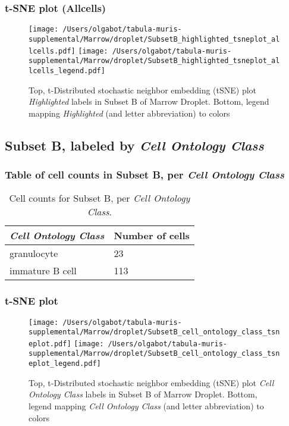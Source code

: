 \subsubsection{t-SNE plot (Allcells)}
\begin{figure}[h]
\centering
\texttt{[image: /Users/olgabot/tabula-muris-supplemental/Marrow/droplet/SubsetB\_highlighted\_tsneplot\_allcells.pdf]}
\texttt{[image: /Users/olgabot/tabula-muris-supplemental/Marrow/droplet/SubsetB\_highlighted\_tsneplot\_allcells\_legend.pdf]}
\caption{Top, t-Distributed stochastic neighbor embedding (tSNE) plot  \emph{Highlighted} labels in Subset B of Marrow Droplet. Bottom, legend mapping \emph{Highlighted} (and letter abbreviation) to colors}
\end{figure}


\clearpage

\subsection{Subset B, labeled by \emph{Cell Ontology Class}}
\subsubsection{Table of cell counts in Subset B, per \emph{Cell Ontology Class}}\begin{table}[h]
\centering
\label{my-label}
\begin{tabular}{@{}ll@{}}
\toprule

\emph{Cell Ontology Class}& Number of cells \\ \midrule
granulocyte & 23 \\

immature B cell & 113 \\
\bottomrule
\end{tabular}
\caption{Cell counts for Subset B, per \emph{Cell Ontology Class}.}
\end{table}

\clearpage
\subsubsection{t-SNE plot}
\begin{figure}[h]
\centering
\texttt{[image: /Users/olgabot/tabula-muris-supplemental/Marrow/droplet/SubsetB\_cell\_ontology\_class\_tsneplot.pdf]}
\texttt{[image: /Users/olgabot/tabula-muris-supplemental/Marrow/droplet/SubsetB\_cell\_ontology\_class\_tsneplot\_legend.pdf]}
\caption{Top, t-Distributed stochastic neighbor embedding (tSNE) plot  \emph{Cell Ontology Class} labels in Subset B of Marrow Droplet. Bottom, legend mapping \emph{Cell Ontology Class} (and letter abbreviation) to colors}
\end{figure}


